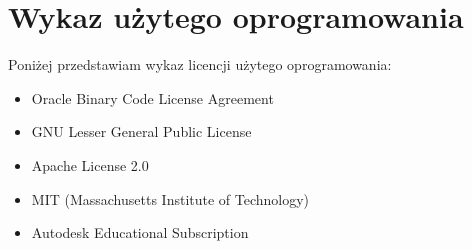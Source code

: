 \chapter{Wykaz użytego oprogramowania}
Poniżej przedstawiam wykaz licencji użytego oprogramowania:
\begin{itemize}
    \item Oracle Binary Code License Agreement
    \item GNU Lesser General Public License
    \item Apache License 2.0
    \item MIT (Massachusetts Institute of Technology)
    \item Autodesk Educational Subscription
\end{itemize}